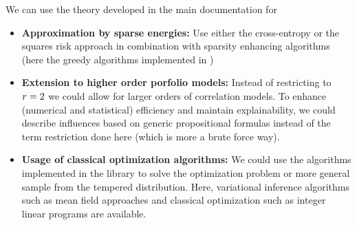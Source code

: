 \documentclass[aps,onecolumn,nofootinbib,pra]{article}
\begin{document}
We can use the theory developed in the main documentation for
\begin{itemize}
	\item \textbf{Approximation by sparse energies:} Use either the cross-entropy or the squares risk approach in combination with sparsity enhancing algorithms (here the greedy algorithms implemented in \tnreason)
	\item \textbf{Extension to higher order porfolio models:} Instead of restricting to $r=2$ we could allow for larger orders of correlation models.
		To enhance (numerical and statistical) efficiency and maintain explainability, we could describe influences based on generic propositional formulas instead of the term restriction done here (which is more a brute force way).
	\item \textbf{Usage of classical optimization algorithms:} We could use the algorithms implemented in the \tnreason library to solve the optimization problem or more general sample from the tempered distribution.
		Here, variational inference algorithms such as mean field approaches and classical optimization such as integer linear programs are available.
\end{itemize}
\end{document}
